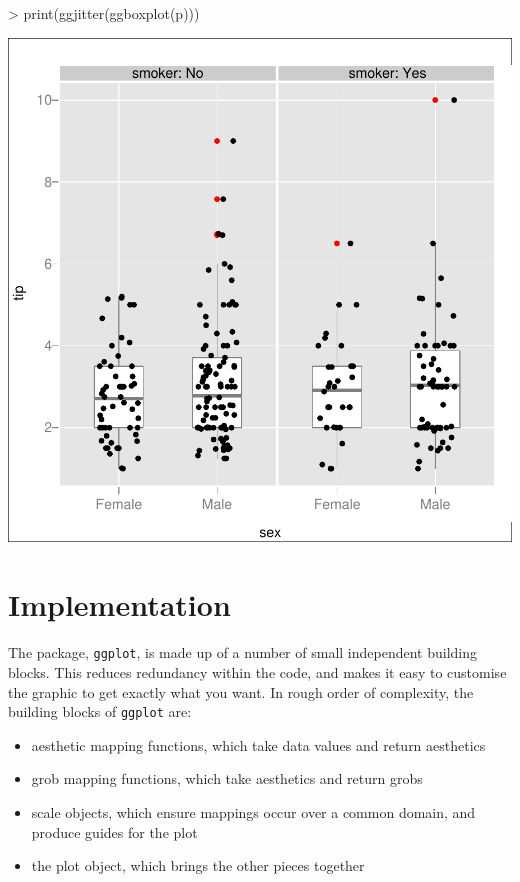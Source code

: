 \documentclass[]{article}
\begin{document}
\begin{Schunk}
\begin{Sinput}
> print(ggjitter(ggboxplot(p)))
\end{Sinput}
\end{Schunk}
\includegraphics{introduction-014}

\section{Implementation}

The package, \texttt{ggplot}, is made up of a number of small independent building blocks.  This reduces redundancy within the code, and makes it easy to customise the graphic to get exactly what you want.  In rough order of complexity, the building blocks of \texttt{ggplot} are:

\begin{itemize}
	\item aesthetic mapping functions, which take data values and return aesthetics
	\item grob mapping functions, which take aesthetics and return grobs
	\item scale objects, which ensure mappings occur over a common domain, and produce guides for the plot
	\item the plot object, which brings the other pieces together
\end{itemize}
\end{document}
